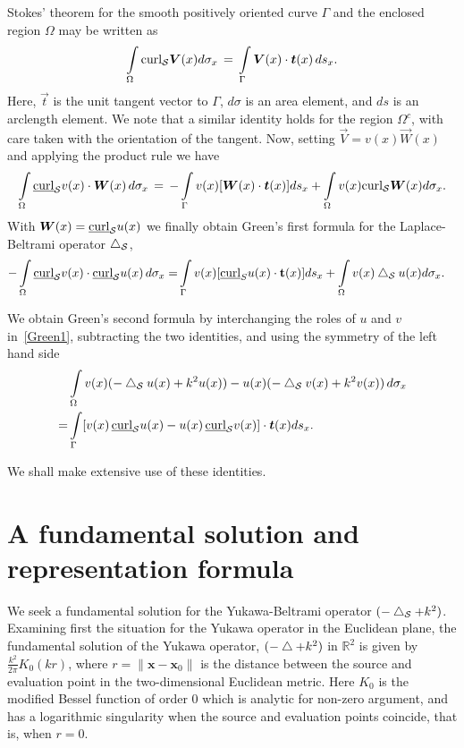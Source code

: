 Stokes' theorem for the  smooth positively oriented curve $\Gamma$ and
the enclosed region $\Omega$ may be written  as
\begin{align*}
  \int\limits_{\Omega} \mbox{curl}_{\S} \vec{V}(x) d\sigma_x \, = \,
  \int\limits_\Gamma \vec{V}(x) \cdot \vec{t}(x) \, ds_x .
\end{align*}
Here, $\vec{t}$ is the unit tangent vector to $\Gamma$, $d\sigma$ is an
area element, and $ds$ is an arclength element. We note that a similar
identity holds for the region $\Omega^{c}$, with care taken with the
orientation of the tangent.  Now, setting $\vec{V} = v(x) \vec{W}(x)$
and applying the product rule we have
\begin{align*}
  \int\limits_{\Omega} \underline{\mbox{curl}}_{\S} v(x) \cdot
  \vec{W}(x) \, d\sigma_x \, = \, 
  -\int\limits_{\Gamma} v(x) [\vec{W}(x) \cdot \vec{t}(x)] ds_x +
  \int\limits_{\Omega} v(x) \mbox{curl}_{\S} \vec{W}(x) d\sigma_x .
\end{align*}
With $\vec{W}(x) = \underline{\mbox{curl}}_{\S} u(x)$ we finally
obtain Green's first formula for the Laplace-Beltrami operator
$\bigtriangleup_{\mathcal{S}}$,
\begin{align}
  \label{Green1}
  -\int\limits_{\Omega} \underline{\mbox{curl}}_{\mathcal{S}} v(x) \cdot
  \underline{\mbox{curl}}_{\mathcal{S}} u(x) \, d\sigma_x 
  =& \int\limits_{\Gamma} v(x) [\underline{\mbox{curl}}_S u(x) \cdot 
  \mathbf{t}(x)] ds_x +\int\limits_{\Omega} v(x) \bigtriangleup_{\mathcal{S}}u(x) d\sigma_x.
\end{align}

We obtain Green's second formula by interchanging the roles of $u$ and
$v$ in~\eqref{Green1}, subtracting the two identities, and using the
symmetry of the left hand side
\begin{align}
  &\int\limits_{\Omega} v(x)(-\lap_{\S}u(x) + k^2 u(x))-
  u(x)(-\lap_{\S}v(x) +k^2v(x))\, d\sigma_x \nonumber \\
  =&\int\limits_\Gamma [v(x)\,\underline{\mbox{curl}}_{\S} 
  u(x) - u(x)\, \underline{\mbox{curl}}_{\S}v(x)] \cdot 
  \vec{t}(x) ds_x.
  \label{Green2}
\end{align}

We shall make extensive use of these identities.





\section{A fundamental solution and representation formula}
We seek a fundamental solution for the Yukawa-Beltrami operator
$(-\bigtriangleup_{\mathcal{S}} + k^2)$.  Examining first the situation for the Yukawa
operator in the Euclidean plane, the fundamental solution of the Yukawa
operator, $(-\bigtriangleup + k^2)$ in $\mathbb{R}^2$ is given by
$\frac{k^2}{2\pi} K_{0}(kr)$, where $r=\|\mathbf{x} - \mathbf{x}_{0}\|$
is the distance between the source and evaluation point in the
two-dimensional Euclidean metric. Here $K_{0}$ is the modified Bessel
function of order 0 which is analytic for non-zero argument, and has a
logarithmic singularity when the source and evaluation points coincide,
that is, when $r=0$.

